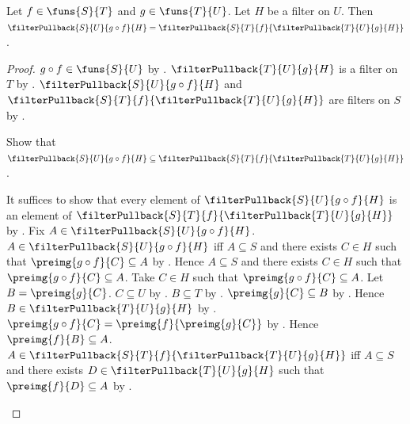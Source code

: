 \begin{theorem}\label{composition_filter_pullback}
    Let $f\in\funs{S}{T}$ and $g\in\funs{T}{U}$.
    Let $H$ be a filter on $U$.
    Then $\filterPullback{S}{U}{g\circ f}{H}
        =\filterPullback{S}{T}{f}{\filterPullback{T}{U}{g}{H}}$.
\end{theorem}
\begin{proof}
    $g\circ f\in\funs{S}{U}$ by .
    $\filterPullback{T}{U}{g}{H}$ is a filter on $T$ by
        .
    $\filterPullback{S}{U}{g\circ f}{H}$ and
        $\filterPullback{S}{T}{f}{\filterPullback{T}{U}{g}{H}}$ are
        filters on $S$ by .

    Show that $\filterPullback{S}{U}{g\circ f}{H}\subseteq
        \filterPullback{S}{T}{f}{\filterPullback{T}{U}{g}{H}}$.
    \begin{subproof}
        It suffices to show that every element of
            $\filterPullback{S}{U}{g\circ f}{H}$ is an element of
            $\filterPullback{S}{T}{f}{\filterPullback{T}{U}{g}{H}}$ by
            .
        Fix $A\in\filterPullback{S}{U}{g\circ f}{H}$.
        $A\in\filterPullback{S}{U}{g\circ f}{H}$ iff
            $A\subseteq S$ and there exists $C\in H$ such that
            $\preimg{g\circ f}{C}\subseteq A$ by
            .
        Hence $A\subseteq S$ and there exists $C\in H$ such that
            $\preimg{g\circ f}{C}\subseteq A$.
        Take $C\in H$ such that $\preimg{g\circ f}{C}\subseteq A$.
        Let $B=\preimg{g}{C}$.
        $C\subseteq U$ by .
        $B\subseteq T$ by .
        $\preimg{g}{C}\subseteq B$ by .
        Hence $B\in\filterPullback{T}{U}{g}{H}$ by
            .
        $\preimg{g\circ f}{C}=\preimg{f}{\preimg{g}{C}}$ by
            .
        Hence $\preimg{f}{B}\subseteq A$.
        $A\in\filterPullback{S}{T}{f}{\filterPullback{T}{U}{g}{H}}$ iff
            $A\subseteq S$ and there exists
            $D\in\filterPullback{T}{U}{g}{H}$ such that
            $\preimg{f}{D}\subseteq A$ by .
    \end{subproof}


\end{proof}
